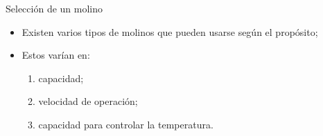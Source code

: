\documentclass[%
spanish,
progressbar=head,
subsectionpage,
aspectratio=169
]{beamer}
\begin{document}
\begin{frame}{Selección de un molino}
    \begin{itemize}[<+-| alert@+>]
        \item Existen varios tipos de molinos que pueden usarse según el propósito;
        \item Estos varían en:
            \begin{enumerate} 
                \item capacidad;
                \item velocidad de operación;
                \item capacidad para controlar la temperatura.
            \end{enumerate}
    \end{itemize}
\end{frame}
\end{document}
